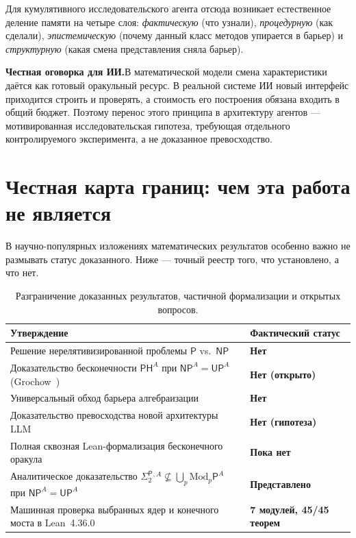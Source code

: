 \documentclass[11pt,a4paper]{article}
\newcommand{\Pcl}{\mathsf{P}}
\newcommand{\NP}{\mathsf{NP}}
\newcommand{\UP}{\mathsf{UP}}
\newcommand{\PH}{\mathsf{PH}}
\newcommand{\Modp}{\mathrm{Mod}_p\mathsf{P}}
\newcommand{\SigTwo}{\Sigma_2^{\mathsf{P}}}
\newcommand{\honestbox}[2]{%
  \vspace{5pt}\noindent\colorbox{warmbg}{%
    \parbox{\dimexpr\linewidth-2\fboxsep\relax}{%
      \vspace{4pt}\textbf{\color{warn}#1.}\hspace{0.45em}#2\vspace{4pt}%
    }%
  }\vspace{5pt}%
}
\begin{document}
Для кумулятивного исследовательского агента отсюда возникает естественное деление памяти на четыре слоя: \emph{фактическую} (что узнали), \emph{процедурную} (как сделали), \emph{эпистемическую} (почему данный класс методов упирается в барьер) и \emph{структурную} (какая смена представления сняла барьер).

\honestbox{Честная оговорка для ИИ}{В математической модели смена характеристики даётся как готовый оракульный ресурс. В реальной системе ИИ новый интерфейс приходится строить и проверять, а стоимость его построения обязана входить в общий бюджет. Поэтому перенос этого принципа в архитектуру агентов — мотивированная исследовательская гипотеза, требующая отдельного контролируемого эксперимента, а не доказанное превосходство.}

\section{Честная карта границ: чем эта работа не является}

В научно-популярных изложениях математических результатов особенно важно не размывать статус доказанного. Ниже — точный реестр того, что установлено, а что нет.

\begin{table}[!htbp]
\centering
\begin{tabularx}{\linewidth}{Xl}
\toprule
\textbf{Утверждение} & \textbf{Фактический статус} \\
\midrule
Решение нерелятивизированной проблемы $\Pcl$ vs.\ $\NP$~\cite{Cook2000} & \textbf{Нет} \\
Доказательство бесконечности $\PH^A$ при $\NP^A = \UP^A$ (Grochow~\cite{Grochow2023}) & \textbf{Нет (открыто)} \\
Универсальный обход барьера алгебраизации & \textbf{Нет} \\
Доказательство превосходства новой архитектуры LLM & \textbf{Нет (гипотеза)} \\
Полная сквозная Lean-формализация бесконечного оракула & \textbf{Пока нет} \\
Аналитическое доказательство $\SigTwo{}^{,A} \not\subseteq \bigcup_p \Modp^A$ при $\NP^A = \UP^A$ & \textbf{Представлено} \\
Машинная проверка выбранных ядер и конечного моста в Lean~4.36.0 & \textbf{7 модулей, 45/45 теорем} \\
\bottomrule
\end{tabularx}
\caption{Разграничение доказанных результатов, частичной формализации и открытых вопросов.}
\end{table}
\end{document}
